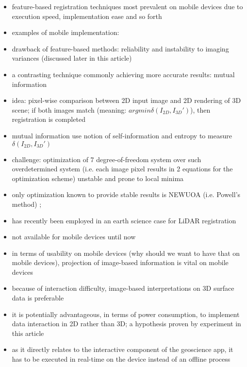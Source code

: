 \documentclass[review]{elsarticle}
\begin{document}
\begin{itemize}
\item feature-based registration techniques most prevalent on mobile devices due to execution speed, implementation ease and so forth
\item examples of mobile implementation: \cite{Gauglitz2014,Sweeny2015,Kehl2017_PHOR,KroehnertXYZ}
\item drawback of feature-based methods: reliability and instability to imaging variances (discussed later in this article)
\item a contrasting technique commonly achieving more accurate results: mutual information
\item idea: pixel-wise comparison between 2D input image and 2D rendering of 3D scene; if both images match (meaning: $argmin \delta(I_{2D}, I_{3D}')$), then registration is completed
\item mutual information \cite{Viola1999} use notion of self-information and entropy to measure $\delta(I_{2D}, I_{3D}')$
\item challenge: optimization of 7 degree-of-freedom system over such overdetermined system (i.e. each image pixel results in 2 equations for the optimization scheme) unstable and prone to local minima
\item only optimization known to provide stable results is NEWUOA (i.e. Powell's method) \cite{Corsini2013}; 
\item has recently been employed in an earth science case for \gls{LiDAR} registration \cite{Guislain2016}
\item not available for mobile devices until now
\end{itemize}

\begin{itemize}
\item in terms of usability on mobile devices (why should we want to have that on mobile devices), projection of image-based information is vital on mobile devices
\item because of interaction difficulty, image-based interpretations on 3D surface data is preferable
\item it is potentially advantageous, in terms of power consumption, to implement data interaction in 2D rather than 3D; a hypothesis proven by experiment in this article
\item as it directly relates to the interactive component of the geoscience app, it has to be executed in real-time on the device instead of an offline process
\end{itemize}
\end{document}
